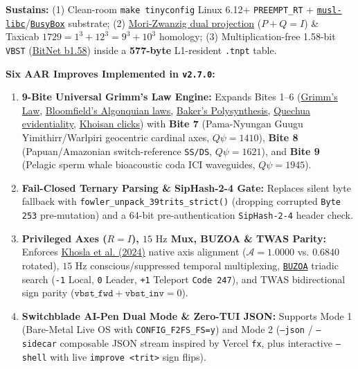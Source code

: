 \documentclass[10pt,twocolumn,letterpaper]{article}
\begin{document}
\textbf{Sustains:} (1) Clean-room \texttt{make tinyconfig} Linux 6.12+ \texttt{PREEMPT\_RT} + \href{https://musl.libc.org/}{\texttt{musl-libc}}/\href{https://busybox.net/}{\texttt{BusyBox}} substrate; (2) \href{https://link.aps.org/doi/10.1103/PhysRevE.111.034130}{Mori-Zwanzig dual projection} ($P + Q = I$) \& Taxicab $1729 = 1^3+12^3=9^3+10^3$ homology; (3) Multiplication-free 1.58-bit \texttt{VBST} (\href{https://arxiv.org/abs/2402.17764}{BitNet b1.58}) inside a \textbf{577-byte} L1-resident \texttt{.tnpt} table.

\textbf{Six AAR Improves Implemented in \texttt{v2.7.0}:}
\begin{enumerate}
  \item \textbf{9-Bite Universal Grimm's Law Engine:} Expands Bites 1--6 (\href{https://en.wikipedia.org/wiki/Grimm%27s_law}{Grimm's Law}, \href{https://en.wikipedia.org/wiki/Algonquian_sound_laws}{Bloomfield's Algonquian laws}, \href{https://www.researchgate.net/publication/269861258_The_Polysynthesis_Parameter}{Baker's Polysynthesis}, \href{https://scholarsarchive.byu.edu/cgi/viewcontent.cgi?article=7216&context=facpub}{Quechua evidentiality}, \href{https://en.wikipedia.org/wiki/Click_consonant}{Khoisan clicks}) with \textbf{Bite 7} (Pama-Nyungan Guugu Yimithirr/Warlpiri geocentric cardinal axes, $Q\psi=1410$), \textbf{Bite 8} (Papuan/Amazonian switch-reference \texttt{SS/DS}, $Q\psi=1621$), and \textbf{Bite 9} (Pelagic sperm whale bioacoustic coda ICI waveguides, $Q\psi=1945$).
  \item \textbf{Fail-Closed Ternary Parsing \& SipHash-2-4 Gate:} Replaces silent byte fallback with \texttt{fowler\_unpack\_39trits\_strict()} (dropping corrupted \texttt{Byte 253} pre-mutation) and a 64-bit pre-authentication \texttt{SipHash-2-4} header check.
  \item \textbf{Privileged Axes ($R=I$), $15\text{ Hz}$ Mux, BUZOA \& TWAS Parity:} Enforces \href{https://www.biorxiv.org/content/10.1101/2024.06.20.599957v1.full-text}{Khosla et al. (2024)} native axis alignment ($\mathcal{A}=1.0000$ vs. $0.6840$ rotated), $15\text{ Hz}$ conscious/suppressed temporal multiplexing, \href{https://www.mql5.com/en/articles/21843}{\texttt{BUZOA}} triadic search (\texttt{-1} Local, \texttt{0} Leader, \texttt{+1} Teleport \texttt{Code 247}), and TWAS bidirectional sign parity ($\texttt{vbst\_fwd} + \texttt{vbst\_inv} = 0$).
  \item \textbf{Switchblade AI-Pen Dual Mode \& Zero-TUI JSON:} Supports Mode 1 (Bare-Metal Live OS with \texttt{CONFIG\_F2FS\_FS=y}) and Mode 2 (\texttt{--json} / \texttt{--sidecar} composable JSON stream inspired by Vercel \texttt{fx}, plus interactive \texttt{--shell} with live \texttt{improve <trit>} sign flips).

\end{enumerate}
\end{document}
